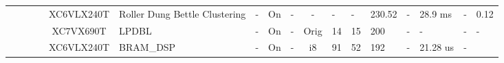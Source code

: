 \begin{table}
\begin{adjustbox}{totalheight=\baselineskip,}
\begin{tabular}{ccccclp{2em}cp{3em}cp{2em}p{4em}p{3em}p{3.5em}p{3.5em}p{2.5em}p{3em}}
\cmidrule{4-17}
   &   &   &\multirow{1}{*}{\cite{ratnakumarHighSpeedRoller2021}}
               &\multirow{1}{*}{XC6VLX240T}
                   &\multirow{1}{*}{Roller Dung Bettle Clustering}
                       &\multirow{1}{*}{-}
                           &\multirow{1}{*}{On}
                               &\multirow{1}{*}{-}
                                   &\multirow{1}{*}{-}
                                       &\multirow{1}{*}{-}
                                           &\multirow{1}{*}{-}
                                               &\multirow{1}{*}{230.52}
                                                   &\multirow{1}{*}{-}
                                                       &\multirow{1}{*}{28.9 ms}
                                                           &\multirow{1}{*}{-}
                                                               &\multirow{1}{*}{0.12}\\
\cmidrule{4-17}
   &   &   &\multirow{1}{*}{\cite{shibiOnboardTargetDetection2021a}}
               &\multirow{1}{*}{XC7VX690T}
                   &\multirow{1}{*}{LPDBL}
                       &\multirow{1}{*}{-}
                           &\multirow{1}{*}{On}
                               &\multirow{1}{*}{-}
                                   &\multirow{1}{*}{Orig}
                                       &\multirow{1}{*}{14}
                                           &\multirow{1}{*}{15}
                                               &\multirow{1}{*}{200}
                                                   &\multirow{1}{*}{-}
                                                       &\multirow{1}{*}{-}
                                                           &\multirow{1}{*}{-}
                                                               &\multirow{1}{*}{-}\\
\cmidrule{4-17}
   &   &   &\multirow{2}{*}{\cite{yahiaouiParallelizationFuzzyARTMAP2017a}}
               &\multirow{2}{*}{XC6VLX240T}
                   &\multirow{1}{*}{BRAM\_DSP}
                       &\multirow{1}{*}{-}
                           &\multirow{1}{*}{On}
                               &\multirow{1}{*}{-}
                                   &\multirow{1}{*}{i8}
                                       &\multirow{1}{*}{91}
                                           &\multirow{1}{*}{52}
                                               &\multirow{1}{*}{192}
                                                   &\multirow{1}{*}{-}
                                                       &\multirow{1}{*}{21.28 us}
                                                           &\multirow{1}{*}{-}

\end{tabular}
\end{adjustbox}
\end{table}

